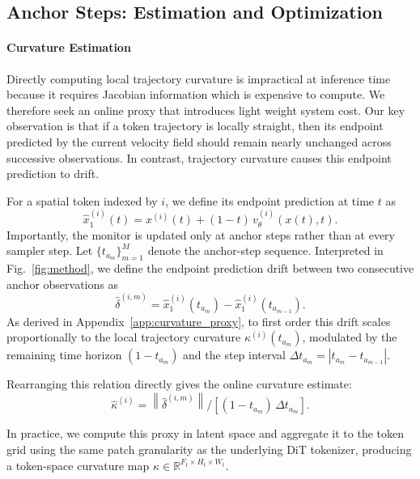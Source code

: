 \subsection{Anchor Steps: Estimation and Optimization}
\label{sec:anchor_step}

\paragraph{Curvature Estimation}
Directly computing local trajectory curvature is impractical at inference time because it requires Jacobian information which is expensive to compute. We therefore seek an online proxy that introduces light weight system cost. Our key observation is that if a token trajectory is locally straight, then its endpoint predicted by the current velocity field should remain nearly unchanged across successive observations. In contrast, trajectory curvature causes this endpoint prediction to drift.

For a spatial token indexed by $i$, we define its endpoint prediction at time $t$ as
\begin{equation}
    \hat{x}_1^{(i)}(t) = x^{(i)}(t) + (1 - t)\, v_\theta^{(i)}(x(t), t).
\end{equation}
Importantly, the monitor is updated only at anchor steps rather than at every sampler step. Let $\{t_{a_m}\}_{m=1}^{M}$ denote the anchor-step sequence. Interpreted in Fig.~\ref{fig:method}, we define the endpoint prediction drift between two consecutive anchor observations as
\begin{equation}
    \hat{\delta}^{(i,m)} = \hat{x}_1^{(i)}(t_{a_m}) - \hat{x}_1^{(i)}(t_{a_{m-1}}).
\end{equation}
As derived in Appendix~\ref{app:curvature_proxy}, to first order this drift scales proportionally to the local trajectory curvature $\kappa^{(i)}(t_{a_m})$, modulated by the remaining time horizon $(1-t_{a_m})$ and the step interval $\Delta t_{a_m} = |t_{a_m} - t_{a_{m-1}}|$.

Rearranging this relation directly gives the online curvature estimate:
\begin{equation}
    \hat{\kappa}^{(i)} = \left\|\hat{\delta}^{(i,m)}\right\|/\left[(1-t_{a_m})\,\Delta t_{a_m}\right].
\end{equation}

In practice, we compute this proxy in latent space and aggregate it to the token grid using the same patch granularity as the underlying DiT tokenizer, producing a token-space curvature map $\kappa \in \mathbb{R}^{F_t \times H_t \times W_t}.$ 

